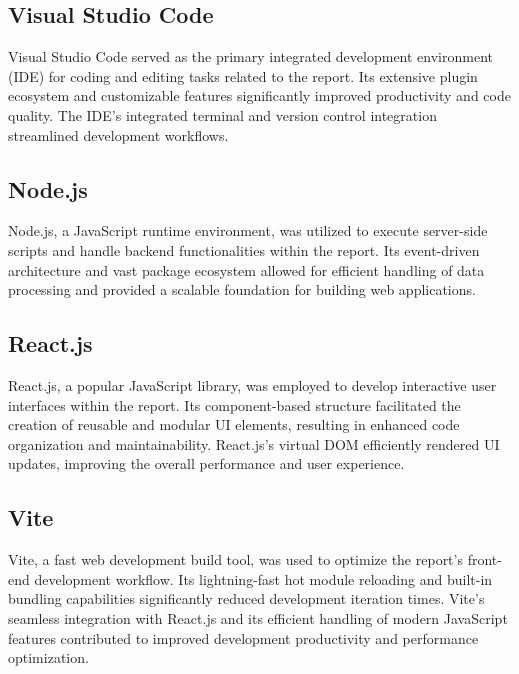 \vspace{1cm}

\subsection*{Visual Studio Code}

Visual Studio Code served as the primary integrated development environment (IDE) for coding and editing tasks related to the report. Its extensive plugin ecosystem and customizable features significantly improved productivity and code quality. The IDE's integrated terminal and version control integration streamlined development workflows.

\vspace{1cm}

\subsection*{Node.js}

Node.js, a JavaScript runtime environment, was utilized to execute server-side scripts and handle backend functionalities within the report. Its event-driven architecture and vast package ecosystem allowed for efficient handling of data processing and provided a scalable foundation for building web applications.

\vspace{1cm}

\subsection*{React.js}

React.js, a popular JavaScript library, was employed to develop interactive user interfaces within the report. Its component-based structure facilitated the creation of reusable and modular UI elements, resulting in enhanced code organization and maintainability. React.js's virtual DOM efficiently rendered UI updates, improving the overall performance and user experience.

\vspace{1cm}

\subsection*{Vite}

Vite, a fast web development build tool, was used to optimize the report's front-end development workflow. Its lightning-fast hot module reloading and built-in bundling capabilities significantly reduced development iteration times. Vite's seamless integration with React.js and its efficient handling of modern JavaScript features contributed to improved development productivity and performance optimization.